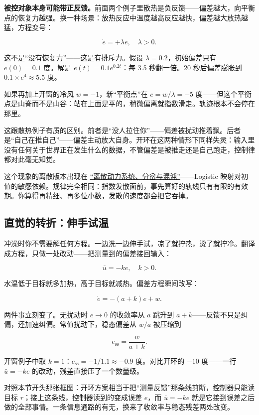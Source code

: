 \textbf{被控对象本身可能带正反馈。}前面两个例子里散热是负反馈——偏差越大，向平衡点的恢复力越强。换一种场景：放热反应中温度越高反应越快，偏差越大放热越猛，方程变号：

\[
\dot e = +\lambda e, \quad \lambda > 0.
\]

这不是``没有恢复力''——这是有排斥力。假设 \(\lambda = 0.2\)，初始偏差只有 \(e(0) = 0.1\) 度。解是 \(e(t) = 0.1 e^{0.2t}\)：每 3.5 秒翻一倍。20 秒后偏差膨胀到 \(0.1 \times e^4 \approx 5.5\) 度。

如果再加上开窗的冷风 \(w = -1\)，新``平衡点''在 \(e = w/\lambda = -5\) 度——但这个平衡点是山脊而不是山谷：站在上面是平的，稍微偏离就指数滑走。轨迹根本不会停在那里。

这跟散热例子有质的区别。前者是``没人拉住你''——偏差被扰动推着飘。后者是``自己在推自己''——偏差主动放大自身。开环在这两种情形下同样失灵：输入里没有任何关于世界正在发生什么的数据，不管偏差是被推走还是自己跑走，控制律都对此毫无知觉。

这个现象的离散版本出现在 \hyperref[sec:15-Differential-Equations-and-Dynamical-Systems/02-Stability-and-Dynamical-Systems/03]{``离散动力系统、分岔与混沌''}——Logistic 映射对初值的敏感依赖。规律完全相同：指数发散面前，事先算好的轨线只有有限的有效期。你算得再精细、再多位小数，发散的速度都会把它吞掉。

\subsection{直觉的转折：伸手试温}

冲澡时你不需要解任何方程。一边洗一边伸手试，凉了就拧热，烫了就拧冷。翻译成方程，只做一处改动——把测量到的偏差接回输入：

\[
\bar u = -k e, \quad k > 0.
\]

水温低于目标就多加热，高于目标就减热。偏差方程瞬间改写：

\[
\dot e = -(a + k) e + w.
\]

两件事立刻变了。无扰动时 \(e \to 0\) 的收敛率从 \(a\) 跳升到 \(a+k\)——反馈不只是纠偏，还加速纠偏。常值扰动下，稳态偏差从 \(w/a\) 被压缩到

\[
e_{\mathrm{ss}} = \frac{w}{a + k}.
\]

开窗例子中取 \(k = 1\)：\(e_{\mathrm{ss}} = -1 / 1.1 \approx -0.9\) 度。对比开环的 \(-10\) 度——一行 \(\bar u = -ke\) 的改动，残差直接压了一个数量级。

对照本节开头那张框图：开环方案相当于把``测量反馈''那条线剪断，控制器只能读目标 \(r\)；接上这条线，控制器读到的变成误差 \(e\)，而 \(\bar u = -ke\) 就是它接到误差之后做的全部事情。一条信息通路的有无，换来了收敛率与稳态残差两处改变。

